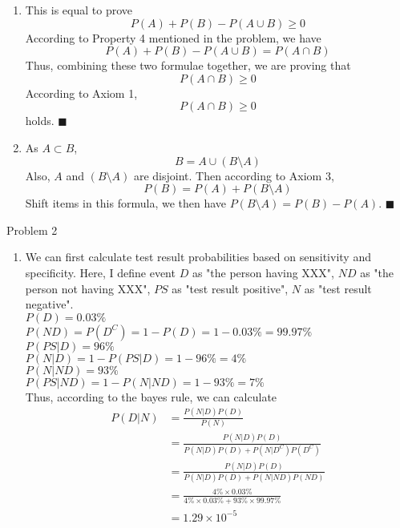 \documentclass[12pt,letterpaper, onecolumn]{exam}
\begin{document}
\begin{questions}
\begin{solution}
\begin{enumerate}
               \item This is equal to prove $$P(A) + P(B) -P(A \cup B) \geq 0$$
               According to Property 4 mentioned in the problem, we have $$P(A) + P(B) -P(A \cup B) = P(A \cap B)$$
               Thus, combining these two formulae together, we are proving that $$P(A \cap B) \geq 0$$
               According to Axiom 1, $$P(A \cap B) \geq 0$$ holds. $\blacksquare$

               \item As $A \subset B$, $$B = A \cup (B \setminus A)$$
               Also, $A$ and $(B \setminus A)$ are disjoint. Then according to Axiom 3, $$P(B) = P(A) + P(B \setminus A)$$ 
               Shift items in this formula, we then have $P(B \setminus A) = P(B) - P(A)$. $\blacksquare$
           \end{enumerate}
    \end{solution}

    \question Problem 2
    \begin{solution}
        \begin{enumerate}
            \item We can first calculate test result probabilities based on sensitivity and specificity. Here, I define event $D$ as "the person having XXX", $ND$ as "the person not having XXX", $PS$ as "test result positive", $N$ as "test result negative". \\
            $P(D) = 0.03\%$ \\
            $P(ND) = P(D^C) = 1 - P(D) = 1 - 0.03\% = 99.97\%$ \\
            $P(PS | D) = 96\%$ \\
            $P(N | D) = 1 - P(PS | D) = 1 - 96\% = 4\%$ \\
            $P(N | ND) = 93\%$ \\
            $P(PS | ND) = 1 - P(N | ND) = 1 - 93\% = 7\%$ \\
            Thus, according to the bayes rule, we can calculate
            \begin{align*}
                P(D | N) & = \frac{P(N|D)P(D)}{P(N)} \\
                & = \frac{P(N|D)P(D)}{P(N|D)P(D) + P(N|D^C)P(D^C)} \\
                & = \frac{P(N|D)P(D)}{P(N|D)P(D) + P(N|ND)P(ND)} \\
                & = \frac{4\% \times 0.03\%}{4\% \times 0.03\% + 93\% \times 99.97\%} \\
                & = 1.29 \times 10^{-5}
            \end{align*}


\end{enumerate}
\end{solution}
\end{questions}
\end{document}
